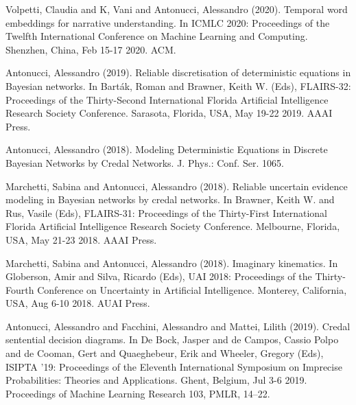\begin{cventries}


\begin{cvitems}
\item Volpetti, Claudia and K, Vani and Antonucci, Alessandro (2020).   Temporal word embeddings for narrative understanding.   In ICMLC 2020: Proceedings of the Twelfth International Conference on Machine Learning and Computing.   Shenzhen, China,   Feb 15-17 2020.   ACM.
\item Antonucci, Alessandro (2019).   Reliable discretisation of deterministic equations in Bayesian networks.   In Barták, Roman and Brawner, Keith W. (Eds), FLAIRS-32: Proceedings of the Thirty-Second International Florida Artificial Intelligence Research Society Conference.   Sarasota, Florida, USA,   May 19-22 2019.   AAAI Press.
\item Antonucci, Alessandro (2018).   Modeling Deterministic Equations in Discrete Bayesian Networks by Credal Networks.   J. Phys.: Conf. Ser. 1065.
\item Marchetti, Sabina and Antonucci, Alessandro (2018).   Reliable uncertain evidence modeling in Bayesian networks by credal networks.   In Brawner, Keith W. and Rus, Vasile (Eds), FLAIRS-31: Proceedings of the Thirty-First International Florida Artificial Intelligence Research Society Conference.   Melbourne, Florida, USA,   May 21-23 2018.   AAAI Press.
\item Marchetti, Sabina and Antonucci, Alessandro (2018).   Imaginary kinematics.   In Globerson, Amir and Silva, Ricardo (Eds), UAI 2018: Proceedings of the Thirty-Fourth Conference on Uncertainty in Artificial Intelligence.   Monterey, California, USA,   Aug 6-10 2018.   AUAI Press.
\item Antonucci, Alessandro and Facchini, Alessandro and Mattei, Lilith (2019).   Credal sentential decision diagrams.   In De Bock, Jasper and de Campos, Cassio Polpo and de Cooman, Gert and Quaeghebeur, Erik and Wheeler, Gregory (Eds), ISIPTA ’19: Proceedings of the Eleventh International Symposium on Imprecise Probabilities: Theories and Applications.   Ghent, Belgium, Jul 3-6 2019.   Proceedings of Machine Learning Research 103, PMLR, 14–22.

\end{cvitems}
\end{cventries}
